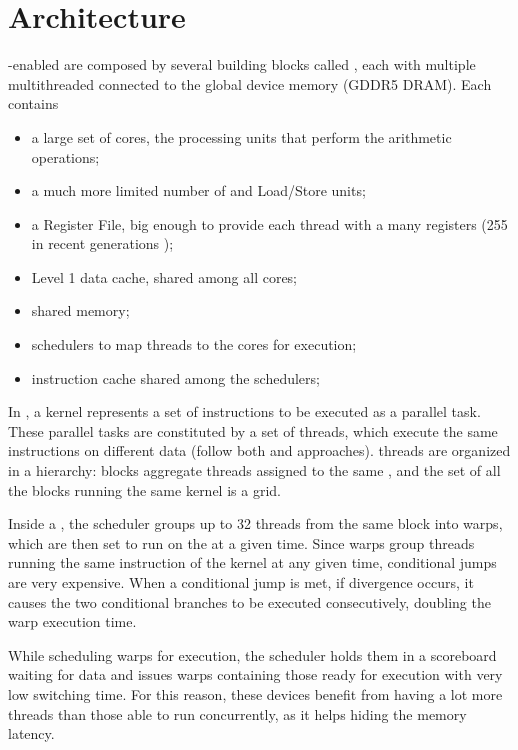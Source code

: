 \documentclass[../thesis]{subfiles}
\begin{document}
	\section{Architecture}
	\label{sec:cuda:arch}
	
	\cuda-enabled \gpus are composed by several building blocks called \gpcs, each with multiple multithreaded \sms connected to the global device memory (GDDR5 DRAM). Each \sm contains
	\begin{itemize}
		\item a large set of \cuda cores, the processing units that perform the arithmetic operations;
		\item a much more limited number of \sfus and Load/Store units;
		\item a Register File, big enough to provide each thread with a many registers (255 in recent generations \cite{NVIDIA:KEPLER});
		\item Level 1 data cache, shared among all cores;
		\item shared memory;
		\item schedulers to map threads to the cores for execution;
		\item instruction cache shared among the schedulers;
	\end{itemize}

	In \cuda, a kernel represents a set of instructions to be executed as a parallel task. These parallel tasks are constituted by a set of \cuda threads, which execute the same instructions on different data (follow both \simd and \simt approaches). \cuda threads are organized in a hierarchy: blocks aggregate threads assigned to the same \sm, and the set of all the blocks running the same kernel is a grid.

	Inside a \sm, the scheduler groups up to 32 threads from the same block into warps, which are then set to run on the \sm at a given time. Since warps group threads running the same instruction of the kernel at any given time, conditional jumps are very expensive. When a conditional jump is met, if divergence occurs, it causes the two conditional branches to be executed consecutively, doubling the warp execution time.

	While scheduling warps for execution, the scheduler holds them in a scoreboard waiting for data and issues warps containing those ready for execution with very low switching time. For this reason, these devices benefit from having a lot more threads than those able to run concurrently, as it helps hiding the memory latency.
\end{document}
